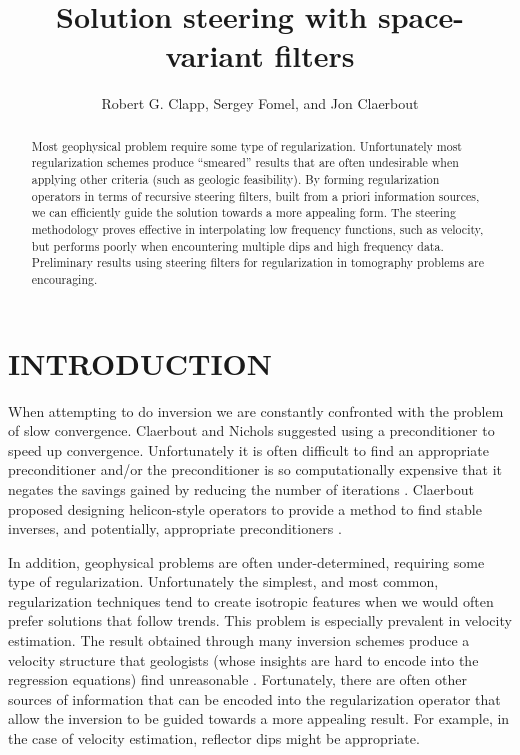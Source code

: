 

\title{Solution steering with space-variant filters}


\author{Robert G. Clapp, Sergey Fomel, and Jon Claerbout}

\begin{abstract}
Most geophysical problem require some type of regularization.
Unfortunately most regularization schemes produce  ``smeared'' results 
that are often undesirable when applying other criteria (such as geologic
feasibility).
By forming regularization operators in terms of 
recursive steering filters, built from a priori information sources,
we can efficiently guide the solution towards
a more appealing form. The steering
methodology proves effective in interpolating
low frequency functions, such as velocity, 
but performs poorly when encountering multiple
dips and high frequency data.  Preliminary results using steering filters for
regularization in tomography problems are encouraging. 
\end{abstract}

\section{INTRODUCTION}
When attempting to do inversion we are constantly confronted with the
problem of slow convergence.  Claerbout and 
Nichols
suggested using a preconditioner
to speed up convergence.  Unfortunately it is often difficult to find an
appropriate preconditioner and/or the preconditioner is so 
computationally expensive that
it negates the savings gained by reducing
the  number of iterations \cite{Claerbout.tdf.82}.
Claerbout 
proposed
designing helicon-style operators
to  provide  a method to find stable inverses, 
and potentially, appropriate preconditioners
\cite{Fomel.sep.95.sergey1,Fomel.sep.94.sergey1}.
\par
In addition, geophysical problems are often under-determined,
requiring some type of regularization.  Unfortunately the simplest,
and most common, regularization techniques tend to create isotropic
features when we would often prefer solutions that follow trends.
This problem is especially prevalent in velocity estimation.  The
result obtained through many inversion schemes produce a velocity
structure that geologists (whose insights are hard to encode into the
regression equations) find unreasonable \cite{Etgen}.  Fortunately,
there are often other sources of information that can be encoded into
the regularization operator that allow the inversion to be guided
towards a more appealing result.  For example, in the case of velocity
estimation, reflector dips might be appropriate.

